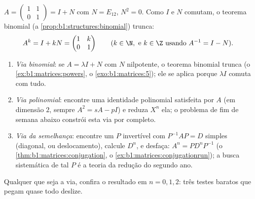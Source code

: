 \begin{example}\label{ex:b1:matrices:powers}
$A = \begin{pmatrix} 1 & 1 \\ 0 & 1\end{pmatrix} = I + N$ com $N =
E_{12}$, $N^2 = 0$. Como $I$ e $N$ comutam, o teorema
binomial (a \cref{prop:b1:structures:binomial}) trunca:
\[
A^k = I + kN = \begin{pmatrix} 1 & k \\ 0 & 1 \end{pmatrix}
\qquad (k \in \N, \text{ e } k \in \Z \text{ usando } A^{-1} = I -
N).
\]
\end{example}

\begin{method}
\label{met:b1:matrices:powers}
\begin{enumerate}
  \item \emph{Via binomial}: se $A = \lambda I + N$ com $N$ nilpotente, o teorema
        binomial trunca (o \cref{ex:b1:matrices:powers}, o \cref{exo:b1:matrices:5}); ele se aplica porque
        $\lambda I$ comuta com tudo.
  \item \emph{Via polinomial}: encontre uma identidade polinomial
        satisfeita por $A$ (em dimensão $2$, sempre $A^2 = sA -
        pI$) e reduza
        $X^n$  ela; o problema de fim de semana abaixo
        constrói esta via por completo.
  \item \emph{Via da semelhança}: encontre um $P$ invertível com
        $P^{-1}AP = D$ simples (diagonal, ou deslocamento), calcule $D^n$, e
        desfaça: $A^n = P D^n P^{-1}$ (o \cref{thm:b1:matrices:conjugation}, o \cref{ex:b1:matrices:conjugationrun}); a busca sistemática de
        tal $P$ é a teoria da redução do segundo ano.
\end{enumerate}
Qualquer que seja a via, confira o resultado em $n = 0, 1, 2$: três testes
baratos que pegam quase todo deslize.
\end{method}

